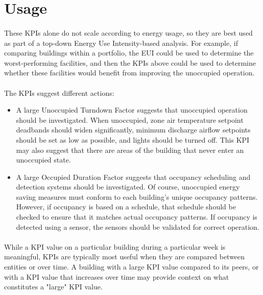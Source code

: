 \documentclass[a4paper]{article}
\begin{document}
\section{Usage}

\paragraph{}
These KPIs alone do not scale according to energy usage, so they are best used as part of a top-down Energy Use Intensity-based analysis. For example, if comparing buildings within a portfolio, the EUI could be used to determine the worst-performing facilities, and then the KPIs above could be used to determine whether these facilities would benefit from improving the unoccupied operation.

\paragraph{}
The KPIs suggest different actions:
\begin{itemize}
\item{A large Unoccupied Turndown Factor suggests that unoccupied operation should be investigated. When unoccupied, zone air temperature setpoint deadbands should widen significantly, minimum discharge airflow setpoints should be set as low as possible, and lights should be turned off. This KPI may also suggest that there are areas of the building that never enter an unoccupied state.}
\item{A large Occupied Duration Factor suggests that occupancy scheduling and detection systems should be investigated. Of course, unoccupied energy saving measures must conform to each building's unique occupancy patterns. However, if occupancy is based on a schedule, that schedule should be checked to ensure that it matches actual occupancy patterns. If occupancy is detected using a sensor, the sensors should be validated for correct operation.}
\end{itemize}

\paragraph{}
While a KPI value on a particular building during a particular week is meaningful, KPIs are typically most useful when they are compared between entities or over time. A building with a large KPI value compared to its peers, or with a KPI value that increases over time may provide context on what constitutes a "large" KPI value.
\end{document}
